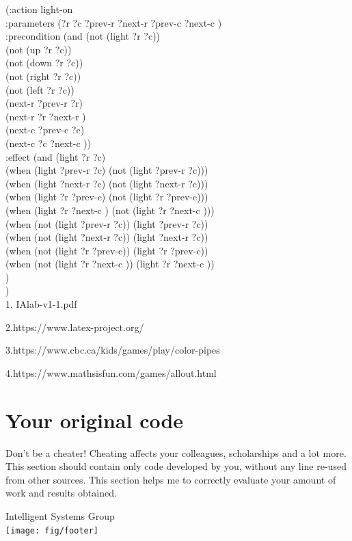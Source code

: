 \documentclass[a4paper,12pt]{report}
\begin{document}
  (:action light-on\\
    :parameters (?r ?c ?prev-r ?next-r ?prev-c ?next-c )\\
    :precondition (and (not (light ?r ?c))\\
	    		(not (up ?r ?c))\\
	    		(not (down ?r ?c))\\
	    		(not (right ?r ?c))\\
	    		(not (left ?r ?c))\\
    			(next-r ?prev-r ?r)\\
    			(next-r ?r ?next-r )\\
    			(next-c ?prev-c ?c)\\
    			(next-c ?c ?next-c ))\\
    :effect (and (light ?r ?c) \\
    		(when (light ?prev-r ?c) (not (light ?prev-r ?c)))\\
    		(when (light ?next-r ?c) (not (light ?next-r ?c)))\\
    		(when (light ?r ?prev-c) (not (light ?r ?prev-c)))\\
    		(when (light ?r ?next-c ) (not (light ?r ?next-c )))\\
    		(when (not (light ?prev-r ?c)) (light ?prev-r ?c))\\
    		(when (not (light ?next-r ?c)) (light ?next-r ?c))\\
    		(when (not (light ?r ?prev-c)) (light ?r ?prev-c))\\
    		(when (not (light ?r ?next-c )) (light ?r ?next-c ))\\
		)\\
	)\\
	



1. IAlab-v1-1.pdf

2.https://www.latex-project.org/

3.https://www.cbc.ca/kids/games/play/color-pipes

4.https://www.mathsisfun.com/games/allout.html

\appendix

\chapter{Your original code}
Don't be a cheater! Cheating affects your colleagues, scholarships and a lot more.
This section should contain only code developed by you, without any line re-used from other sources. 
This section helps me to correctly evaluate your amount of work and results obtained. 


\vspace{2cm}
 
\begin{center}
Intelligent Systems Group\\
\texttt{[image: fig/footer]}
\end{center}
\end{document}

